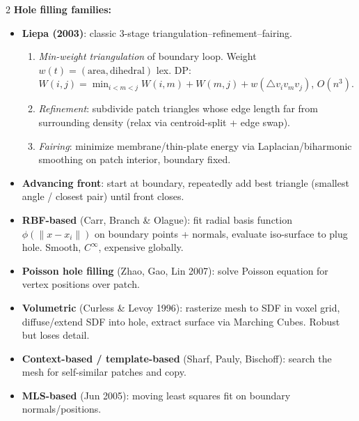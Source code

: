 \begin{paracol}{2}
\textbf{Hole filling families:}
\begin{itemize}[leftmargin=*,nosep]
  \item \textbf{Liepa (2003)}: classic 3-stage triangulation–refinement–fairing.
    \begin{enumerate}[leftmargin=1.2em,nosep]
      \item \emph{Min-weight triangulation} of boundary loop. Weight $w(t){=}(\text{area},\text{dihedral})$ lex. DP: $W(i,j){=}\min_{i<m<j} W(i,m){+}W(m,j){+}w(\triangle v_iv_mv_j)$, $O(n^3)$.
      \item \emph{Refinement}: subdivide patch triangles whose edge length far from surrounding density (relax via centroid-split + edge swap).
      \item \emph{Fairing}: minimize membrane/thin-plate energy via Laplacian/biharmonic smoothing on patch interior, boundary fixed.
    \end{enumerate}
  \item \textbf{Advancing front}: start at boundary, repeatedly add best triangle (smallest angle / closest pair) until front closes.
  \item \textbf{RBF-based} (Carr, Branch \& Olague): fit radial basis function $\phi(\|x-x_i\|)$ on boundary points + normals, evaluate iso-surface to plug hole. Smooth, $C^\infty$, expensive globally.
  \item \textbf{Poisson hole filling} (Zhao, Gao, Lin 2007): solve Poisson equation for vertex positions over patch.
  \item \textbf{Volumetric} (Curless \& Levoy 1996): rasterize mesh to SDF in voxel grid, diffuse/extend SDF into hole, extract surface via Marching Cubes. Robust but loses detail.
  \item \textbf{Context-based / template-based} (Sharf, Pauly, Bischoff): search the mesh for self-similar patches and copy.
  \item \textbf{MLS-based} (Jun 2005): moving least squares fit on boundary normals/positions.
\end{itemize}


\end{paracol}
